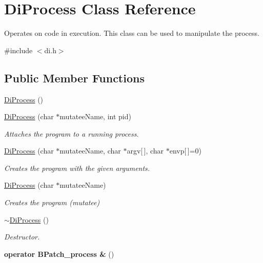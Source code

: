 \hypertarget{class_di_process}{\section{Di\-Process Class Reference}
\label{class_di_process}
}


Operates on code in execution. This class can be used to manipulate the process.  




{\ttfamily \#include $<$di.\-h$>$}

\subsection*{Public Member Functions}
\begin{DoxyCompactItemize}
\item 
\hyperlink{class_di_process_abc88219761bfa55e5b3b0ce31fd0721c}{Di\-Process} ()
\item 
\hyperlink{class_di_process_a29fffcfa25576de71c6b0dd64b1b166a}{Di\-Process} (char $\ast$mutatee\-Name, int pid)
\begin{DoxyCompactList}\small\item\em Attaches the program to a running process. \end{DoxyCompactList}\item 
\hyperlink{class_di_process_abe9d867d2622eddf74ab7cdc2951bd7b}{Di\-Process} (char $\ast$mutatee\-Name, char $\ast$argv\mbox{[}$\,$\mbox{]}, char $\ast$envp\mbox{[}$\,$\mbox{]}=0)
\begin{DoxyCompactList}\small\item\em Creates the program with the given arguments. \end{DoxyCompactList}\item 
\hyperlink{class_di_process_af93de25bc325bea42a69c2df0fee7075}{Di\-Process} (char $\ast$mutatee\-Name)
\begin{DoxyCompactList}\small\item\em Creates the program (mutatee) \end{DoxyCompactList}\item 
\hypertarget{class_di_process_a7c46390461846d2baaff0164e5122ab7}{\hyperlink{class_di_process_a7c46390461846d2baaff0164e5122ab7}{$\sim$\-Di\-Process} ()}\label{class_di_process_a7c46390461846d2baaff0164e5122ab7}

\begin{DoxyCompactList}\small\item\em Destructor. \end{DoxyCompactList}\item 
\hypertarget{class_di_process_a1c1615ae17ce6fa1d9a0b129db349e2b}{{\bfseries operator B\-Patch\-\_\-process \&} ()}\label{class_di_process_a1c1615ae17ce6fa1d9a0b129db349e2b}


\end{DoxyCompactItemize}
